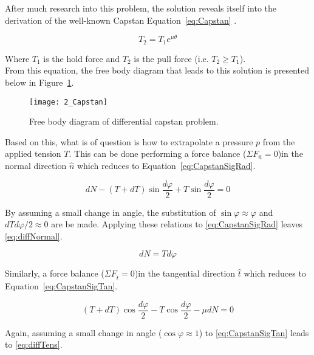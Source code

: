 After much research into this problem, the solution reveals itself into the derivation of the well-known Capstan Equation~\ref{eq:Capstan} \citep{capstanman}.

\begin{equation}
	\label{eq:Capstan}
	T_2 = T_1 e^{\mu\theta}
\end{equation}

Where $T_1$ is the hold force and $T_2$ is the pull force (i.e. $T_2 \geq T_1$). \\

From this equation, the free body diagram that leads to this solution is presented below in Figure~\ref{fig:Capstan}. 

\begin{figure}[H]
	\centering
	\texttt{[image: 2\_Capstan]}
	\caption{Free body diagram of differential capstan problem. \citep{capstanman}}
	\label{fig:Capstan}
\end{figure}

Based on this, what is of question is how to extrapolate a pressure $p$ from the applied tension $T$. This can be done performing a force balance ($\Sigma F_{\hat{n}} = 0 $)in the normal direction $\hat{n}$ which reduces to Equation~\ref{eq:CapstanSigRad}.

\begin{equation}
	\label{eq:CapstanSigRad}
	dN-(T+dT)\sin \frac{d\varphi}{2}+T\sin \frac{d\varphi}{2}= 0
\end{equation}

By assuming a small change in angle, the substitution of $\sin \varphi \approx \varphi$ and $dT d\varphi/2 \approx 0$ are be made. Applying these relations to \ref{eq:CapstanSigRad} leaves \ref{eq:diffNormal}.

\begin{equation}
	\label{eq:diffNormal}
	dN = T d\varphi
\end{equation}


Similarly, a force balance ($\Sigma F_{\hat{t}} = 0 $)in the tangential direction $\hat{t}$ which reduces to Equation~\ref{eq:CapstanSigTan}.

\begin{equation}
	\label{eq:CapstanSigTan}
	(T+dT)\cos \frac{d\varphi}{2}- T\cos \frac{d\varphi}{2} - \mu dN= 0
\end{equation}

Again, assuming a small change in angle ($\cos \varphi \approx 1$) to \ref{eq:CapstanSigTan} leads to \ref{eq:diffTens}.

